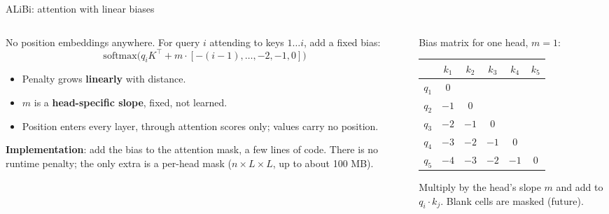 \documentclass[aspectratio=169,11pt]{beamer}
\begin{document}
\begin{frame}{ALiBi: attention with linear biases}
  \begin{columns}[T]
    \begin{column}{0.52\textwidth}
      \small
      No position embeddings anywhere. For query $i$ attending to keys $1\ldots i$, add a fixed bias:
      \[
        \text{softmax}\big(q_iK^\top + m\cdot[-(i-1),\ldots,-2,-1,0]\big)
      \]
      \begin{itemize}
        \item Penalty grows \textbf{linearly} with distance.
        \item $m$ is a \textbf{head-specific slope}, fixed, not learned.
        \item Position enters every layer, through attention scores only; values carry no position.
      \end{itemize}
      \vspace{1mm}
      \textbf{Implementation}: add the bias to the attention mask, a few lines of code. There is no runtime penalty; the only extra is a per-head mask ($n\times L\times L$, up to about 100 MB).
    \end{column}
    \begin{column}{0.44\textwidth}
      \centering
      \small
      Bias matrix for one head, $m=1$:
      \vspace{1mm}

      \begin{tabular}{@{}c|ccccc@{}}
        & $k_1$ & $k_2$ & $k_3$ & $k_4$ & $k_5$\\
        \hline
        $q_1$ & 0 & & & &\\
        $q_2$ & $-1$ & 0 & & &\\
        $q_3$ & $-2$ & $-1$ & 0 & &\\
        $q_4$ & $-3$ & $-2$ & $-1$ & 0 &\\
        $q_5$ & $-4$ & $-3$ & $-2$ & $-1$ & 0\\
      \end{tabular}
      \vspace{1mm}

      {\scriptsize Multiply by the head's slope $m$ and add to $q_i\cdot k_j$. Blank cells are masked (future).}
    \end{column}
  \end{columns}
\end{frame}
\end{document}
